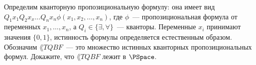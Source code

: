 Определим кванторную пропозициональную формулу: она имеет вид \\
$Q_1 x_1 Q_2 x_x \dots Q_n x_n \phi(x_1, x_2, \dots, x_n)$, где $\phi$~--- пропозициональная формула от переменных $x_1,
\dots, x_n$, а $Q_i \in \{\exists, \forall\}$~--- кванторы. Переменные $x_i$ принимают значения $\{0, 1\}$, истинность
формулы определяется естественным образом. Обозначим $\lang{TQBF}$~--- это множество истинных кванторных пропозициональных
формул. Докажите, что $\lang{TQBF}$ лежит в $\PSpace$.
